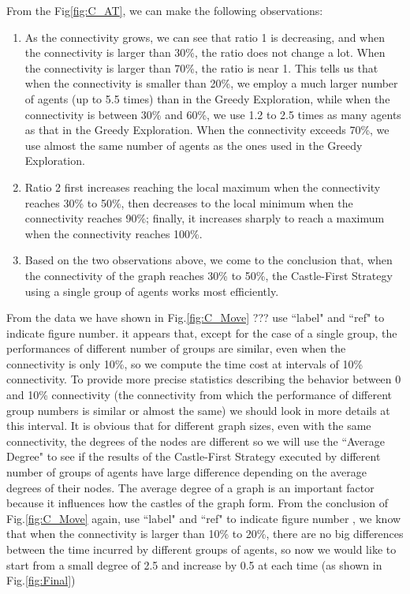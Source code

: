 From the Fig\ref{fig:C_AT}, we can make  the following observations:
\begin{enumerate}
\item As the connectivity grows, we can see that ratio 1 is decreasing, and when the connectivity is larger than 30\%, the ratio does not change a lot. When the connectivity is larger than 70\%, the ratio is near 1.
This tells us that when the connectivity is smaller than 20\%, we employ a much larger number of   agents (up to 5.5 times) than in the {\sc Greedy} Exploration,  while when the connectivity is between 30\% and  60\%, we use 1.2 to 2.5 times as many agents as that in the {\sc Greedy} Exploration. When the connectivity exceeds 70\%, we use almost the same number of agents as the ones used in the {\sc Greedy} Exploration.
\item Ratio 2 first increases reaching the local maximum when the connectivity reaches 30\% to 50\%, then decreases to the local minimum when the connectivity reaches 90\%; finally, it increases sharply to reach a maximum when the connectivity reaches 100\%.
\item Based on the two observations above, we come to the conclusion that, when the connectivity of the graph reaches 30\% to 50\%, the {\sc Castle-First} Strategy using a single group of agents works most efficiently.
\end{enumerate}

From the data we have shown in Fig.\ref{fig:C_Move}  \color{blue} ??? use ``label{}" and  ``ref{}"  to indicate figure number. \color{black} it appears that, except for the case of a single group,
the performances of different number of groups are similar,  even when the connectivity is only 10\%, so we compute the time cost at intervals of  10\% connectivity. 
To provide more precise statistics describing 
the behavior between 0 and   10\% connectivity (the connectivity from which the performance of different group numbers is similar or almost the same) we should look in more details at this interval.
It is obvious that for different graph sizes, even with the same connectivity, the degrees of the nodes are different so we  will use the   ``Average Degree"   to see if the results of the {\sc Castle-First} Strategy executed by different number of groups of agents have large difference depending on the average degrees of their nodes. The average degree of a graph is an important factor because it influences how the castles of the graph form. From the conclusion of Fig.\ref{fig:C_Move} \color{blue} again, use ``label{}" and  ``ref{}"  to indicate figure number  \color{black}, we know that when the connectivity is larger than 10\% to 20\%, there are no big differences between   the time incurred by different groups of agents, so now we would like to start from a small degree of 2.5 and increase by 0.5  at each  time (as shown in Fig.\ref{fig:Final})

